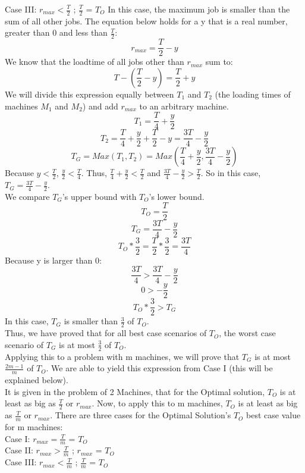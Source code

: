 \documentclass[11pt, solution, letterpaper]{format}
\begin{document}
Case III: $r_{max} < \frac{T}{2}$ ; $\frac{T}{2}$ = $T_O$
In this case, the maximum job is smaller than the sum of all other jobs. The equation below holds for a y that is a real number, greater than 0 and less than $\frac{T}{2}$: \\
$$r_{max} = \frac{T}{2} - y$$
We know that the loadtime of all jobs other than $r_{max}$ sum to:\\
$$T - (\frac{T}{2} - y) = \frac{T}{2} + y$$
We will divide this expression equally between $T_1$ and $T_2$ (the loading times of machines $M_1$ and $M_2$) and add $r_{max}$ to an arbitrary machine.\\
$$T_1 = \frac{T}{4} + \frac{y}{2}$$
$$T_2 = \frac{T}{4} + \frac{y}{2} + \frac{T}{2} - y = \frac{3T}{4} - \frac{y}{2}$$
$$T_G = Max(T_1, T_2) = Max(\frac{T}{4} + \frac{y}{2}, \frac{3T}{4} - \frac{y}{2}) $$
Because $y < \frac{T}{2}$, $\frac{y}{2} < \frac{T}{4}$. Thus, $\frac{T}{4} + \frac{y}{2} < \frac{T}{2}$ and $\frac{3T}{4} - \frac{y}{2} > \frac{T}{2}$. So in this case, $T_G = \frac{3T}{4} - \frac{y}{2}$.\\


We compare $T_G$'s upper bound with $T_O$'s lower bound.\\
$$T_O = \frac{T}{2}$$
$$T_G = \frac{3T}{4} - \frac{y}{2}$$
$$ T_O * \frac{3}{2} = \frac{T}{2} * \frac{3}{2} = \frac{3T}{4}$$
Because y is larger than 0:
$$ \frac{3T}{4} > \frac{3T}{4} - \frac{y}{2}$$
$$ 0 > -\frac{y}{2}$$
$$T_O * \frac{3}{2} > T_G$$
In this case, $T_G$ is smaller than $\frac{3}{2}$ of $T_O$.\\

Thus, we have proved that for all best case scenarios of $T_O$, the worst case scenario of $T_G$ is at most $\frac{3}{2}$ of $T_O$.\\


Applying this to a problem with m machines, we will prove that $T_G$ is at most $\frac{2m - 1}{m}$ of $T_O$. We are able to yield this expression from Case I (this will be explained below).\\

It is given in the problem of 2 Machines, that for the Optimal solution, $T_O$ is at least as big as $\frac{T}{2}$ or $r_{max}$. Now, to apply this to m machines,  $T_O$ is at least as big as $\frac{T}{m}$ or $r_{max}$. There are three cases for the Optimal Solution's $T_O$ best case value for m machines:\\

Case I: $r_{max} = \frac{T}{m}$ = $T_O$\\
Case II: $r_{max} > \frac{T}{m}$ ; $r_{max}$ = $T_O$\\
Case III: $r_{max} < \frac{T}{m}$ ; $\frac{T}{m}$ = $T_O$\\
\end{document}
